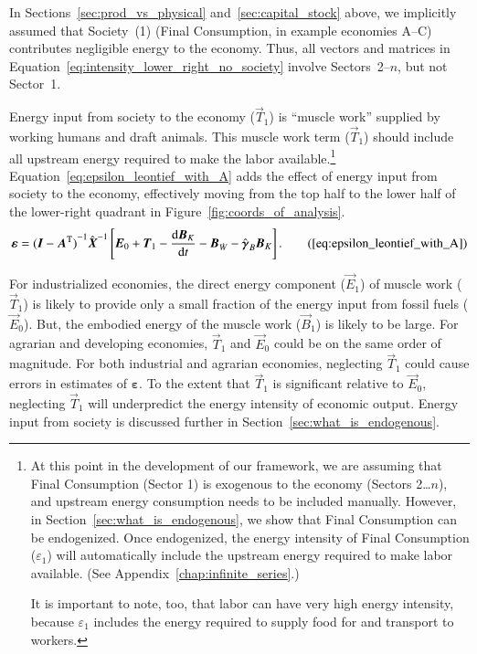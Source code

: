 In Sections~\ref{sec:prod_vs_physical}
and~\ref{sec:capital_stock} above,
we implicitly assumed that Society~(1) 
(Final Consumption, in example economies A--C) %
contributes negligible energy to the economy.
Thus, all vectors and matrices in Equation~\ref{eq:intensity_lower_right_no_society}
involve Sectors~2--$n$, but not Sector~1.

Energy input from society to the economy ($\vec{T}_{1}$)
is ``muscle work'' supplied by working humans 
and draft animals.\cite{Ayres:2003ec,Ayres:2010ug,Warr:2012cg} 
This muscle work term ($\vec{T}_{1}$) should include
all upstream energy required to make the labor available.\footnote{At this point 
	in the development of our framework,
	we are assuming that Final Consumption (Sector 1) is exogenous to the economy 
	(Sectors 2\ldots{}$n$), 
	and upstream energy consumption needs to be included manually.
	However, in Section~\ref{sec:what_is_endogenous}, we show that Final Consumption
	can be endogenized.
	Once endogenized, the energy intensity of Final Consumption ($\varepsilon_{1}$) 
	will automatically include the upstream energy required to make labor available.
	(See Appendix~\ref{chap:infinite_series}.)

	It is important to note, too, that labor can have very high energy intensity, 
	because $\varepsilon_{1}$ includes the energy required to supply food 
	for and transport to workers.} 
Equation~\ref{eq:epsilon_leontief_with_A} 
adds the effect of energy input from society to the economy,
effectively moving from the top half to the lower half of the lower-right quadrant
in Figure~\ref{fig:coords_of_analysis}.
%
\begin{equation}
	\boldsymbol{\varepsilon} 
	= {(\vec{I} - \vec{A}^{\mathrm{T}})}^{-1}\hat{\vec{X}}^{-1}
		\left[\vec{E}_{0} 
				+ \vec{T}_{1} 
				- \frac{\mathrm{d}\vec{B}_{K}}{\mathrm{d}t} 
				- \vec{B}_{\dot{W}}
				- \hat{\boldsymbol{\gamma}}_{B}\vec{B}_{K}
		\right].\tag{\ref{eq:epsilon_leontief_with_A}}
\end{equation}

For industrialized economies, the direct energy component ($\vec{E}_{1}$) 
of muscle work ($\vec{T}_{1}$)
is likely to provide only a small fraction
of the energy input from fossil fuels ($\vec{E}_{0}$).
But, the embodied energy of the muscle work ($\vec{B}_{1}$) is likely to be large.
For agrarian
and developing economies, 
$\vec{T}_{1}$ and $\vec{E}_{0}$ 
could be on the same order of magnitude.
For both industrial and agrarian economies,
neglecting $\vec{T}_{1}$ could cause errors
in estimates of $\boldsymbol{\varepsilon}$.
To the extent that $\vec{T}_{1}$ 
is significant relative to $\vec{E}_{0}$,
neglecting $\vec{T}_{1}$
will underpredict the energy intensity of economic output.
Energy input from society is discussed further 
in Section~\ref{sec:what_is_endogenous}.


